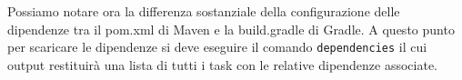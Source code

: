Possiamo notare ora la differenza sostanziale della configurazione delle dipendenze tra il pom.xml di Maven e la build.gradle di Gradle. A questo punto per scaricare le dipendenze si deve eseguire il comando \texttt{dependencies} il cui output restituirà una lista di tutti i task con le relative dipendenze associate.